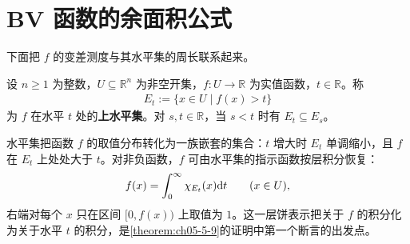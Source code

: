 \documentclass[../../main.tex]{subfiles}%
\begin{document}
\section{BV 函数的余面积公式}\label{section:ch05-05}

下面把 $f$ 的变差测度与其水平集的周长联系起来。

\begin{definition*}[水平集]\label{definition:ch05-def-5-9-水平集}
设 $n\geqslant1$ 为整数，$U\subseteq\mathbb{R}^n$ 为非空开集，$f:U\to\mathbb{R}$ 为实值函数，$t\in\mathbb{R}$。称
\begin{align*}
E_t:=\{x\in U\mid f(x)>t\}
\end{align*}
为 $f$ 在水平 $t$ 处的\textbf{上水平集}。对 $s,t\in\mathbb{R}$，当 $s<t$ 时有 $E_t\subseteq E_s$。
\end{definition*}

\begin{remark}\label{remark:ch05-def-5-9-动机}
水平集把函数 $f$ 的取值分布转化为一族嵌套的集合：$t$ 增大时 $E_t$ 单调缩小，且 $f$ 在 $E_t$ 上处处大于 $t$。对非负函数，$f$ 可由水平集的指示函数按层积分恢复：
\begin{align*}
f(x)=\int_0^{\infty}\chi_{E_t}(x)\mathrm{d} t\qquad(x\in U),
\end{align*}
右端对每个 $x$ 只在区间 $[0,f(x))$ 上取值为 $1$。这一层饼表示把关于 $f$ 的积分化为关于水平 $t$ 的积分，是\cref{theorem:ch05-5-9}的证明中第一个断言的出发点。%
\end{remark}
\end{document}
